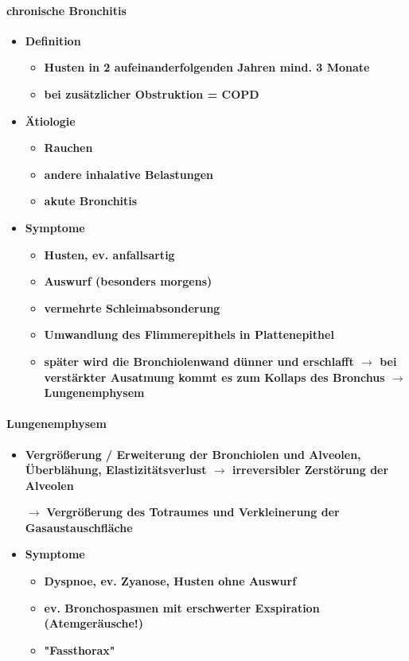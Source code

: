 		\paragraph{chronische Bronchitis}
			\begin{itemize}
				\item \textbf{Definition}
					\begin{itemize}
						\item \textbf{Husten in 2 aufeinanderfolgenden Jahren mind. 3 Monate}
						\item \textbf{bei zusätzlicher Obstruktion = COPD}
					\end{itemize}
				\item \textbf{Ätiologie}
					\begin{itemize}
						\item \textbf{Rauchen}
						\item \textbf{andere inhalative Belastungen}
						\item \textbf{akute Bronchitis}
					\end{itemize}
	\pagebreak
				\item \textbf{Symptome}
					\begin{itemize}
						\item \textbf{Husten, ev. anfallsartig}
						\item \textbf{Auswurf (besonders morgens)}
						\item \textbf{vermehrte Schleimabsonderung}
						\item \textbf{Umwandlung des Flimmerepithels in Plattenepithel}
						\item \textbf{später wird die Bronchiolenwand dünner und erschlafft $\rightarrow$ bei verstärkter Ausatmung kommt es zum Kollaps des Bronchus $\rightarrow$ Lungenemphysem}
					\end{itemize}
			\end{itemize}
		\paragraph{Lungenemphysem}
			\begin{itemize}
				\item \textbf{Vergrößerung / Erweiterung der Bronchiolen und Alveolen, Überblähung, Elastizitätsverlust $\rightarrow$ irreversibler Zerstörung der Alveolen}
				\item[$\rightarrow$] \textbf{Vergrößerung des Totraumes und Verkleinerung der Gasaustauschfläche}
				\item \textbf{Symptome}
					\begin{itemize}
						\item \textbf{Dyspnoe, ev. Zyanose, Husten ohne Auswurf}
						\item \textbf{ev. Bronchospasmen mit erschwerter Exspiration (Atemgeräusche!)}
						\item \textbf{"Fassthorax"}
					\end{itemize}
			\end{itemize}
